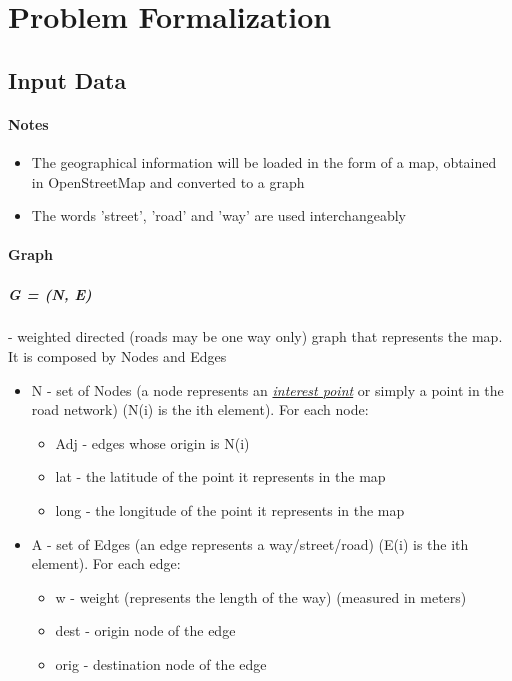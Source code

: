 \chapter{Problem Formalization}


\section{Input Data}

\subsubsection{Notes}
\begin{itemize}
    \item The geographical information will be loaded in the form of a map, obtained in OpenStreetMap and converted to a graph
    \item The words 'street', 'road' and 'way' are used interchangeably
\end{itemize}

\subsubsection{Graph}
\paragraph{G = (N, E)} - weighted directed (roads may be one way only) graph that represents the map. It is composed by Nodes and Edges
\begin{itemize}

	\item N - set of Nodes (a node represents an \uline{\textit{interest point}} or simply a point in the road network) (N(i) is the ith element). For each node:
\begin{itemize}
	\item Adj - edges whose origin is N(i)
	\item lat - the latitude of the point it represents in the map
	\item long - the longitude of the point it represents in the map
\end{itemize}

	\item A - set of Edges (an edge represents a way/street/road) (E(i) is the ith element). For each edge:
\begin{itemize}
	\item w - weight (represents the length of the way) (measured in meters)
	\item dest - origin node of the edge
	\item orig - destination node of the edge
\end{itemize}

\end{itemize}

